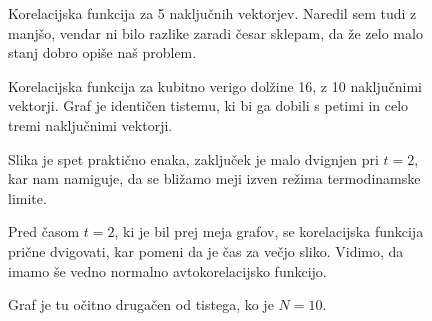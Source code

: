 \documentclass[a4 paper, 12pt]{article}
\begin{document}
\begin{figure}[H]
   \begin{center}
      
   \end{center}
   \vspace{-20pt}
   \caption{Korelacijska funkcija za 5 naključnih vektorjev. Naredil sem tudi z manjšo, vendar ni bilo razlike
	zaradi česar sklepam, da že zelo malo stanj dobro opiše naš problem.}
   \label{fig:pic}
   \vspace{-10pt}
\end{figure}

\begin{figure}[H]
   \begin{center}
      
   \end{center}
   \vspace{-20pt}
   \caption{Korelacijska funkcija za kubitno verigo dolžine 16, z 10 naključnimi vektorji. Graf je identičen
	tistemu, ki bi ga dobili s petimi in celo tremi naključnimi vektorji.}
   \label{fig:pic}
   \vspace{-10pt}
\end{figure}

\begin{figure}[H]
   \begin{center}
      
   \end{center}
   \vspace{-20pt}
   \caption{Slika je spet praktično enaka, zaključek je malo dvignjen pri 
	$t = 2$, kar nam namiguje, da se bližamo meji izven režima
	termodinamske limite.}
   \label{fig:pic}
   \vspace{-10pt}
\end{figure}

\begin{figure}[H]
   \begin{center}
      
   \end{center}
   \vspace{-20pt}
   \caption{Pred časom $t = 2$, ki je bil prej meja grafov, se korelacijska
	funkcija prične dvigovati, kar pomeni da je čas za večjo sliko. Vidimo,
	da imamo še vedno normalno avtokorelacijsko funkcijo.}
   \label{fig:pic}
   \vspace{-10pt}
\end{figure}

\begin{figure}[H]
   \begin{center}
      
   \end{center}
   \vspace{-20pt}
   \caption{Graf je tu očitno drugačen od tistega, ko je $N = 10$.}
   \label{fig:pic}
   \vspace{-10pt}
\end{figure}
\end{document}
